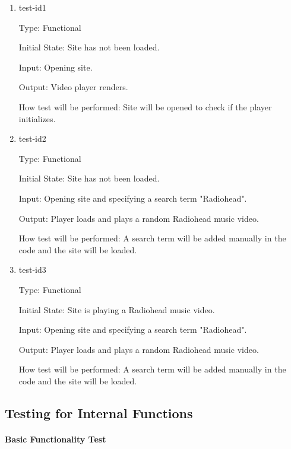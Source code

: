\documentclass[12pt, titlepage]{article}
\begin{document}
\begin{enumerate}

\item{test-id1\\}

Type: Functional
					
Initial State: Site has not been loaded.
					
Input: Opening site.
					
Output: Video player renders.
					
How test will be performed: Site will be opened to check if the player initializes.
					
\item{test-id2\\}

Type: Functional
					
Initial State: Site has not been loaded.
					
Input: Opening site and specifying a search term "Radiohead".
					
Output: Player loads and plays a random Radiohead music video.
					
How test will be performed: A search term will be added manually in the code and the site will be loaded.

\item{test-id3\\}

Type: Functional
					
Initial State: Site is playing a Radiohead music video.
					
Input: Opening site and specifying a search term "Radiohead".
					
Output: Player loads and plays a random Radiohead music video.
					
How test will be performed: A search term will be added manually in the code and the site will be loaded.

\end{enumerate}

\subsection{Testing for Internal Functions}
\paragraph{Basic Functionality Test}
\end{document}
